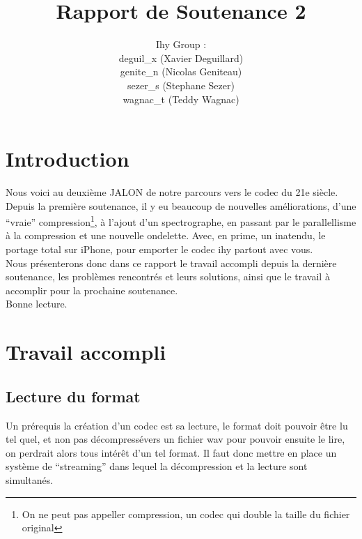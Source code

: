 \documentclass[a4paper,12pt]{article}
\title{Rapport de Soutenance 2}
\author{
Ihy Group : \\
deguil\_x (Xavier Deguillard)\\
genite\_n (Nicolas Geniteau)\\
sezer\_s (Stephane Sezer)\\
wagnac\_t (Teddy Wagnac)
}
\begin{document}
\maketitle

\newpage

\section*{Introduction}
Nous voici au deuxi\`eme JALON de notre parcours vers le codec du 21e si\`ecle. Depuis la premi\`ere soutenance, il y eu
beaucoup de nouvelles am\'eliorations, d'une ``vraie'' compression\footnote{On ne peut pas appeller compression, un codec qui
double la taille du fichier original}, \`a l'ajout d'un spectrographe, en passant par le parallellisme \`a la compression et une nouvelle ondelette. Avec,
en prime, un inatendu, le portage total sur iPhone, pour emporter le codec ihy partout avec vous.\\
Nous présenterons donc dans ce rapport
le travail accompli depuis la derni\`ere soutenance, les problèmes
rencontrés et leurs solutions, ainsi que le travail à accomplir pour la
prochaine soutenance.\\

Bonne lecture.

\newpage

\tableofcontents

\newpage

\section{Travail accompli}
	\subsection{Lecture du format}
Un pr\'erequis la cr\'eation d'un codec est sa lecture, le format doit
pouvoir \^etre lu tel quel, et non pas d\'ecompress\'evers un fichier wav pour
pouvoir ensuite le lire, on
perdrait alors tous int\'er\^et d'un tel format. Il faut donc mettre en place un
syst\`eme de ``streaming'' dans lequel la d\'ecompression et la lecture sont
simultan\'es.
\end{document}
